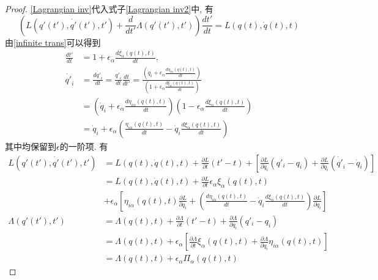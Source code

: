 \documentclass[a4paper,11pt]{book}
\newtheorem{proof}{证明}[section]
\begin{document}
\begin{proof}
  \eqref{Lagrangian inv}代入式子\eqref{Lagrangian inv2}中, 有
  \begin{equation}\label{coninv Lagrangian}
      \left(L(q'(t'),\dot{q'}(t'),t')+\frac{d}{dt'}\Lambda(q'(t'),t')\right)\frac{dt'}{dt}=L(q(t),\dot{q}(t),t)
  \end{equation}
  由\eqref{infinite trans}可以得到
  \begin{equation*}
    \begin{split}
       \frac{dt'}{dt}&=1+\epsilon_\alpha\frac{d\xi_\alpha(q(t),t)}{dt},\\
        \dot{q'}_i&=\frac{d\dot{q'}_i}{dt}=\frac{\dot{q'}_i}{dt}\frac{dt}{dt'}=\frac{\left(\dot{q}_i+\epsilon_\alpha\frac{d\eta_{i\alpha}(q(t),t)}{dt}\right)}{\left(1+\epsilon_\alpha\frac{d\xi_{\alpha}(q(t),t)}{dt}\right)}\\
         &=\left(\dot{q}_i+\epsilon_\alpha\frac{d\eta_{i\alpha}(q(t),t)}{dt}\right)\left(1-\epsilon_\alpha\frac{d\xi_{\alpha}(q(t),t)}{dt}\right)\\
         &=\dot{q}_i+\epsilon_\alpha\left(\frac{\eta_{i\alpha}(q(t),t)}{dt}-\dot{q}_i\frac{d\xi_{\alpha}(q(t),t)}{dt}\right)
    \end{split}
  \end{equation*}
  其中均保留到$\epsilon$的一阶项. 有
  \begin{equation*}
    \begin{split}
       L(q'(t'),\dot{q'}(t'),t')&=L(q(t),\dot{q}(t),t)+\frac{\partial L}{\partial t}(t'-t)+\left[\frac{\partial{L}}{\partial{\dot{q}_i}}(q'_i-q_i)+\frac{\partial L}{\partial{\dot{q}_i}}(\dot{q'}_i-\dot{q}_i)\right]\\
         & =L(q(t),\dot{q}(t),t)+\frac{\partial L}{\partial t}\epsilon_\alpha\xi_\alpha(q(t),t)\\
         & +\epsilon_\alpha\left[\eta_{i\alpha}(q(t),t)\frac{\partial L}{\partial {q_i}}+\left(\frac{d\eta_{i\alpha}(q(t),t)}{dt}-\dot{q}_i\frac{d\xi_\alpha(q(t),t)}{dt}\right)\frac{\partial L}{\partial \dot{q}_i}\right]\\
         \Lambda(q'(t'),t')&=\Lambda(q(t),t)+\frac{\partial \Lambda}{\partial t}(t'-t)+\frac{\partial \Lambda}{\partial{q_i}}(q'_i-q_i)\\
         &=\Lambda(q(t),t)+\epsilon_\alpha\left[\frac{\partial \Lambda}{\partial t}\xi_\alpha(q(t),t)+\frac{\partial \Lambda}{\partial q_i}\eta_{i\alpha}(q(t),t)\right]\\
         &=\Lambda(q(t),t)+\epsilon_\alpha\Pi_\alpha(q(t),t)
    \end{split}

\end{equation*}
\end{proof}
\end{document}
